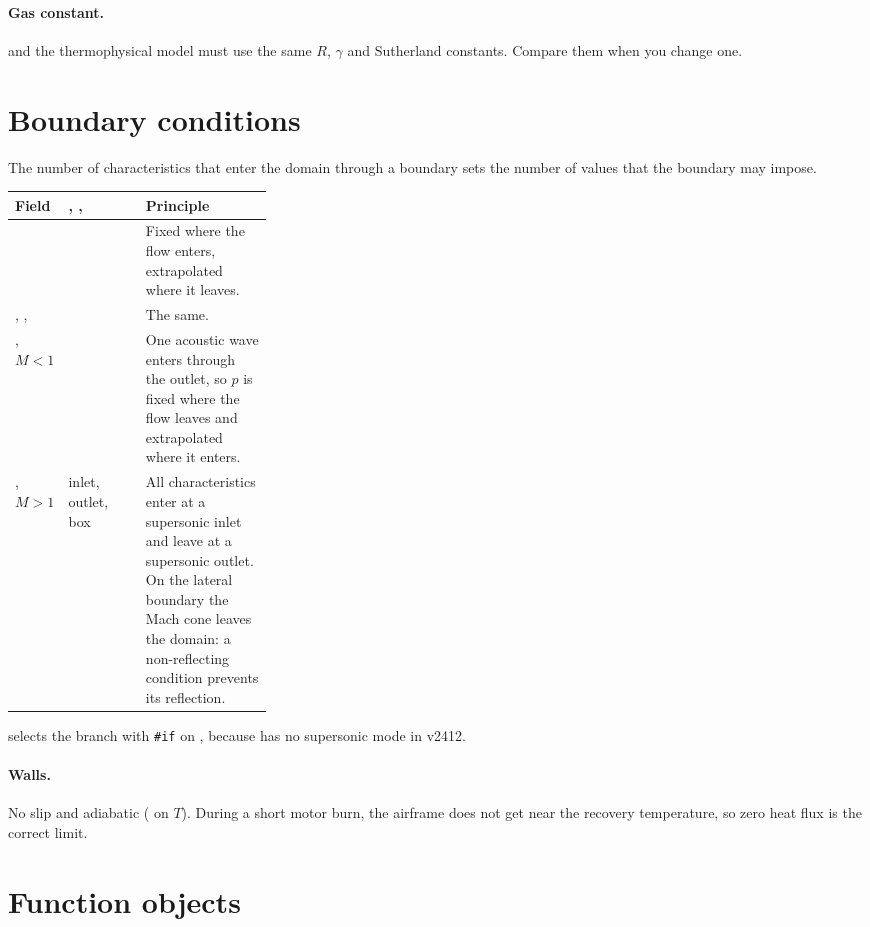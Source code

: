 \paragraph{Gas constant.}  and the thermophysical model must use the
same $R$, $\gamma$ and Sutherland constants. Compare them when you change one.

\section{Boundary conditions}\label{sec:bc}

The number of characteristics that enter the domain through a boundary sets the number
of values that the boundary may impose.

\begin{tabularx}{\linewidth}{@{}l P{0.30\linewidth} L@{}}
\toprule
Field & , ,  & Principle \\
\midrule
{} &  & Fixed where the flow enters, extrapolated where it leaves. \\
, ,  &  & The same. \\
, $M < 1$ &  & One acoustic wave enters through the outlet, so $p$ is fixed where the flow leaves and extrapolated where it enters. \\
, $M > 1$ &  inlet,  outlet,  box & All characteristics enter at a supersonic inlet and leave at a supersonic outlet. On the lateral boundary the Mach cone leaves the domain: a non-reflecting condition \citep{poinsot1992} prevents its reflection. \\
\bottomrule
\end{tabularx}

\medskip
{} selects the branch with \texttt{\#if} on , because
 has no supersonic mode in v2412.

\paragraph{Walls.} No slip and adiabatic ( on $T$). During a short
motor burn, the airframe does not get near the recovery temperature, so zero heat flux
is the correct limit.

\section{Function objects}\label{sec:function-objects}


